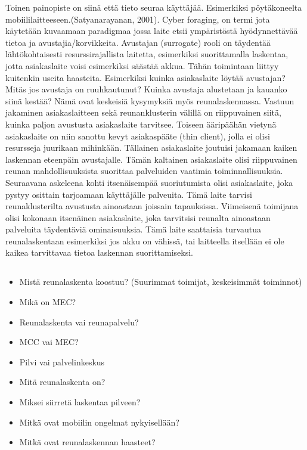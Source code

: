 \documentclass[finnish]{tktltiki2}
\theoremstyle{definition}
\theoremstyle{remark}
\begin{document}
Toinen painopiste on siinä että tieto seuraa käyttäjää. Esimerkiksi pöytäkoneelta mobiililaitteeseen.(Satyanarayanan, 2001).
Cyber foraging, on termi jota käytetään kuvaamaan paradigmaa jossa laite etsii ympäristöstä hyödynnettävää tietoa ja avustajia/korvikkeita. Avustajan (surrogate) rooli on täydentää lähtökohtaisesti resurssirajallista laitetta, esimerkiksi suorittamalla laskentaa, jotta asiakaslaite voisi esimerkiksi säästää akkua.
Tähän toimintaan liittyy kuitenkin useita haasteita. Esimerkiksi kuinka asiakaslaite löytää avustajan? Mitäs jos avustaja on ruuhkautunut? Kuinka avustaja alustetaan ja kauanko siinä kestää? 
Nämä ovat keskeisiä kysymyksiä myös reunalaskennassa. 
Vastuun jakaminen asiakaslaitteen sekä reunanklusterin välillä on riippuvainen siitä, kuinka paljon avustusta asiakaslaite tarvitsee. 
Toiseen ääripäähän vietynä asiakaslaite on niin sanottu kevyt asiakaspääte (thin client), jolla ei olisi resursseja juurikaan mihinkään. Tällainen asiakaslaite joutuisi jakamaan kaiken laskennan eteenpäin avustajalle. 
Tämän kaltainen asiakaslaite olisi riippuvainen reunan mahdollisuuksista suorittaa palveluiden vaatimia toiminnallisuuksia. 
Seuraavana askeleena kohti itsenäisempää suoriutumista olisi asiakaslaite, joka pystyy osittain tarjoamaan käyttäjälle palveuita. Tämä laite tarvisi reunaklusterilta avustusta ainoastaan joissain tapauksissa. 
Viimeisenä toimijana olisi kokonaan itsenäinen asiakaslaite, joka tarvitsisi reunalta ainoastaan palveluita täydentäviä ominaisuuksia.
Tämä laite saattaisia turvautua reunalaskentaan esimerkiksi jos akku on vähissä, tai laitteella itsellään ei ole kaikea tarvittavaa tietoa laskennan suorittamiseksi.

\subsection{}
\begin{itemize}
\item Mistä reunalaskenta koostuu? (Suurimmat toimijat, keskeisimmät toiminnot)
\item Mikä on MEC?
\item Reunalaskenta vai reunapalvelu?
\item MCC vai MEC?
\item Pilvi vai palvelinkeskus
\item Mitä reunalaskenta on?
\item Miksei siirretä laskentaa pilveen?
\item Mitkä ovat mobiilin ongelmat nykyisellään?
\item Mitkä ovat reunalaskennan haasteet?
\end{itemize}
\end{document}
